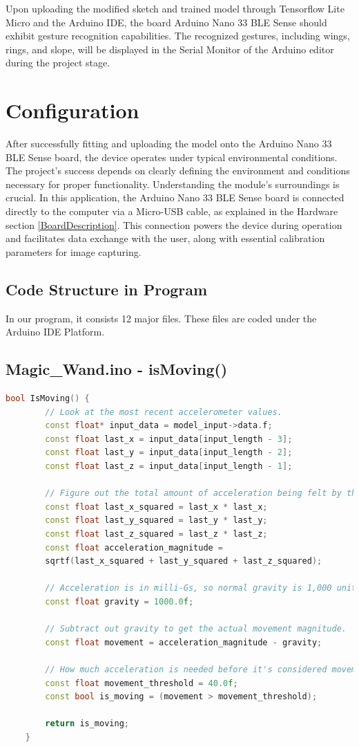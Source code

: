 Upon uploading the modified sketch and trained model through Tensorflow Lite Micro and the Arduino IDE, the board Arduino Nano 33 BLE Sense should exhibit gesture recognition capabilities. The recognized gestures, including wings, rings, and slope, will be displayed in the Serial Monitor of the Arduino editor during the project stage.

\section{Configuration}
After successfully fitting and uploading the model onto the Arduino Nano 33 BLE Sense board, the device operates under typical environmental conditions. The project's success depends on clearly defining the environment and conditions necessary for proper functionality. Understanding the module's surroundings is crucial. In this application, the Arduino Nano 33 BLE Sense board is connected directly to the computer via a Micro-USB cable, as explained in the Hardware section \ref{BoardDescription}. This connection powers the device during operation and facilitates data exchange with the user, along with essential calibration parameters for image capturing.

\subsection{Code Structure in Program}

In our program, it consists 12 major files. These files are coded under the Arduino IDE Platform. 

\subsection{Magic\_Wand.ino - isMoving()}
\begin{lstlisting}[language=C++, caption={C++ Function to Detect Movement Based on Accelerometer Data}, label={code:movement-detection}, style=bashstyle]
	bool IsMoving() {
		// Look at the most recent accelerometer values.
		const float* input_data = model_input->data.f;
		const float last_x = input_data[input_length - 3];
		const float last_y = input_data[input_length - 2];
		const float last_z = input_data[input_length - 1];
		
		// Figure out the total amount of acceleration being felt by the device.
		const float last_x_squared = last_x * last_x;
		const float last_y_squared = last_y * last_y;
		const float last_z_squared = last_z * last_z;
		const float acceleration_magnitude =
		sqrtf(last_x_squared + last_y_squared + last_z_squared);
		
		// Acceleration is in milli-Gs, so normal gravity is 1,000 units.
		const float gravity = 1000.0f;
		
		// Subtract out gravity to get the actual movement magnitude.
		const float movement = acceleration_magnitude - gravity;
		
		// How much acceleration is needed before it's considered movement.
		const float movement_threshold = 40.0f;
		const bool is_moving = (movement > movement_threshold);
		
		return is_moving;
	}
\end{lstlisting}

